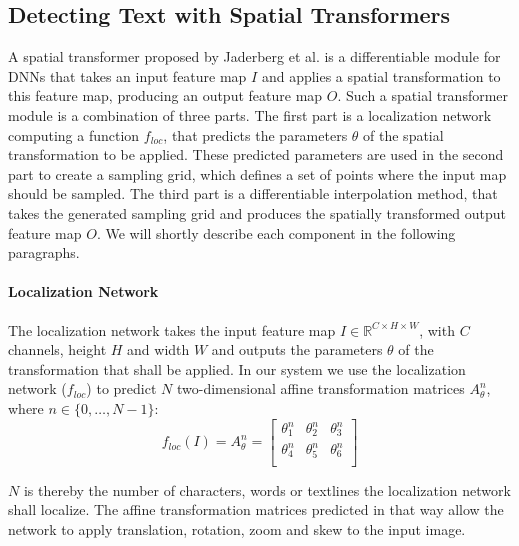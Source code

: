 \documentclass[letterpaper]{article}
\begin{document}
	\subsection{Detecting Text with Spatial Transformers}
	\label{subsec:ps_spatial_transformer_networks}

	A spatial transformer proposed by Jaderberg et al. \cite{Jaderberg2015Spatial} is a differentiable module for \acp{DNN} that takes an input feature map $I$ and applies a spatial transformation to this feature map, producing an output feature map $O$.
	Such a spatial transformer module is a combination of three parts.
	The first part is a localization network computing a function $f_{loc}$, that predicts the parameters $\theta$ of the spatial transformation to be applied.
	These predicted parameters are used in the second part to create a sampling grid, which defines a set of points where the input map should be sampled.
	The third part is a differentiable interpolation method, that takes the generated sampling grid and produces the spatially transformed output feature map $O$.
	We will shortly describe each component in the following paragraphs.

	\paragraph{Localization Network}
		The localization network takes the input feature map $I \in \mathbb{R}^{C \times H \times W}$, with $C$ channels, height $H$ and width $W$ and outputs the parameters $\theta$ of the transformation that shall be applied.
		In our system we use the localization network ($f_{loc}$) to predict $N$ two-dimensional affine transformation matrices $A^{n}_{\theta}$, where $n \in \{0, \ldots, N - 1\}$:
		\begin{equation}
			f_{loc}(I) = A^{n}_{\theta} =
			\begin{bmatrix}
				\theta^{n}_1 & \theta^{n}_2 & \theta^{n}_3 \\
				\theta^{n}_4 & \theta^{n}_5 & \theta^{n}_6 \\
			\end{bmatrix}
		\end{equation}

		$N$ is thereby the number of characters, words or textlines the localization network shall localize.
		The affine transformation matrices predicted in that way allow the network to apply translation, rotation, zoom and skew to the input image.
\end{document}
